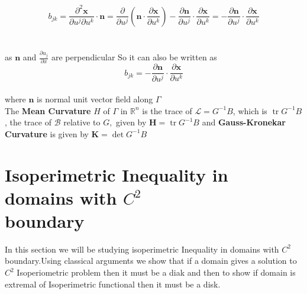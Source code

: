 \documentclass[oneside]{book}
\theoremstyle{definition}
\begin{document}
      $$b_{j k}=\frac{\partial^{2} \mathbf{x}}{\partial u^{j} \partial u^{k}} \cdot \mathbf{n}=\frac{\partial}{\partial u^{j}}\left(\mathbf{n} \cdot \frac{\partial \mathbf{x}}{\partial u^{k}}\right)-\frac{\partial \mathbf{n}}{\partial u^{j}} \cdot \frac{\partial \mathbf{x}}{\partial u^{k}}=-\frac{\partial \mathbf{n}}{\partial u^{j}} \cdot \frac{\partial \mathbf{x}}{\partial u^{k}}$$ \\\\
      
      
       as $\boldsymbol{n}$ and $\frac{\partial u_{j}}{\partial x} $ are perpendicular
      So it can also be written as 
        \begin{equation}
        \label{eq22}  
       b_{j k} = -\frac{\partial \mathbf{n}}{\partial u^{j}} \cdot \frac{\partial \mathbf{x}}{\partial u^{k}}         \end{equation} \\
       where $\mathbf{n}$ is normal unit vector field along $\Gamma$ \\

      
      The \textbf{Mean Curvature} $H$ of $\Gamma$ in $\mathbb{R}^{n}$ is the trace of $\mathcal{L} = G^{-1} B$, which is $\operatorname{tr} G^{-1} B$, the trace of $\mathcal{B}$ relative
to $G,$ given by
$
\boldsymbol{H}=\operatorname{tr} G^{-1} B
$ and \textbf{Gauss-Kronekar Curvature} is given by $\boldsymbol{K}=\operatorname{det} {G}^{-1} {B}$





\section{Isoperimetric Inequality in domains with $C^{2}$ \\boundary} 
\label{s:5}
In this section we will be studying isoperimetric Inequality in domains with $C^{2}$ boundary.Using classical arguments we show that if a domain gives a solution to $C^{2}$  Isoperiometric problem then it must be a diak and then to show if domain is extremal of Isoperimetric functional then it must be a disk.
\end{document}
